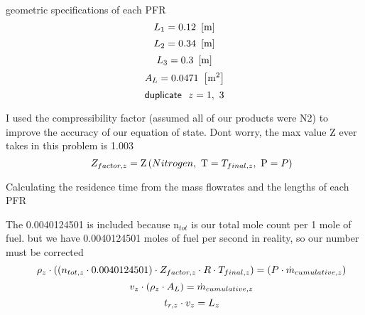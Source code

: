 \documentclass[10pt,fleqn]{article}
\newcommand{\F}[1]{\mbox{$#1$}}
\newcommand{\K}[1]{\mbox{\sf#1\ \ \mit}}
\newcommand{\I}{\mbox{\hspace{0.20in}}}
\newcommand{\compressibilityfactor}{\mathrm{Z}}
\begin{document}
\vspace{0.04in}
\noindent
\rm geometric specifications of each PFR
\begin{equation}
\label{EES Eqn:81}
L_{1} = 0.12   \   \left[ \rm m \right] 
\end{equation}
\rm
\begin{equation}
\label{EES Eqn:82}
L_{2} = 0.34   \   \left[ \rm m \right] 
\end{equation}
\rm
\begin{equation}
\label{EES Eqn:83}
L_{3} = 0.3   \   \left[ \rm m \right] 
\end{equation}
\rm
\begin{equation}
\label{EES Eqn:84}
A_{L} = 0.0471   \   \left[ \rm m^{2} \right] 
\end{equation}
\rm
\begin{equation}
\label{EES Eqn:85}
\K{duplicate} z=1,\ 3 
\end{equation}

\vspace{0.04in}
\noindent
\rm I used the compressibility factor (assumed all of our products were N2) to improve the accuracy of our equation of state. Dont worry, the max value Z ever takes in this problem is 1.003
\begin{equation}
\I \label{EES Eqn:86}
Z_{factor,z}=\compressibilityfactor \left(\F{Nitrogen},\mbox{\ T}=T_{final,z},\mbox{\ P}=P \right)  
\end{equation}

\vspace{0.04in}
\noindent
\rm Calculating the residence time from the mass flowrates and the lengths of each PFR

\vspace{0.04in}
\noindent
\rm The 0.0040124501 is included because n$_{tot}$ is our total mole count per 1 mole of fuel. but we have 0.0040124501 moles of fuel per second in reality, so our number must be corrected
\begin{equation}
\I \label{EES Eqn:87}
\rho_{z} \cdot   \left(  \left( n_{tot,z} \cdot  0.0040124501 \right)  \cdot  Z_{factor,z} \cdot  R \cdot  T_{final,z} \right)  =  \left( P \cdot  \dot {m}_{cumulative,z} \right)  
\end{equation}
\begin{equation}
\I \label{EES Eqn:88}
v_{z} \cdot   \left( \rho_{z} \cdot  A_{L} \right)  = \dot {m}_{cumulative,z} 
\end{equation}
\begin{equation}
\I \label{EES Eqn:89}
t_{r,z} \cdot  v_{z} = L_{z} 
\end{equation}
\end{document}
